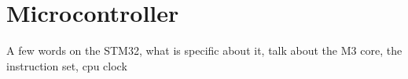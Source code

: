 \section{Microcontroller}

A few words on the STM32, what is specific about it, talk about the M3 core, the
instruction set, cpu clock
